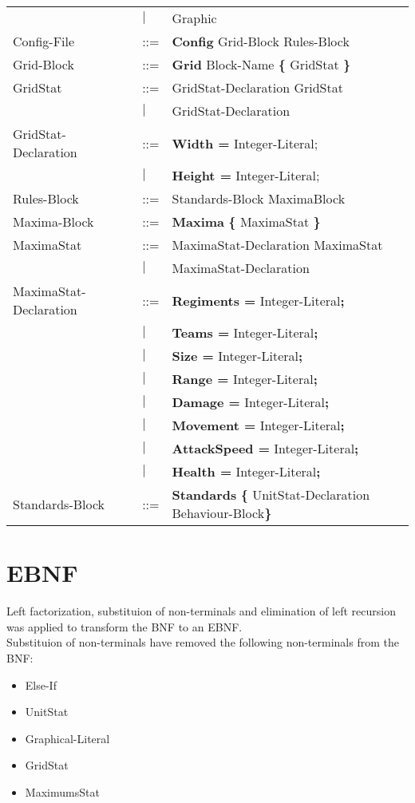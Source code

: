 \begin{center}
\begin{longtable}{l l l}
							&$\mid$	&Graphic\\
Config-File					&	::=	&{\bf Config} Grid-Block Rules-Block\\
Grid-Block					&	::=	&{\bf Grid} Block-Name	 {\bf \{} GridStat \bf{\}}\\
GridStat					&	::=	&GridStat-Declaration GridStat\\
							&$\mid$	&GridStat-Declaration \\
GridStat-Declaration		&	::=	&{\bf Width = } Integer-Literal;\\
							&$\mid$	&{\bf Height = } Integer-Literal;\\
Rules-Block					&	::=	&Standards-Block MaximaBlock\\
Maxima-Block				&	::=	&{\bf Maxima} {\bf \{} MaximaStat {\bf \}} \\
MaximaStat				&	::=		&MaximaStat-Declaration MaximaStat\\
							&$\mid$	&MaximaStat-Declaration\\
MaximaStat-Declaration	&	::=	&{\bf Regiments = } Integer-Literal{\bf ;}\\
							&$\mid$	&{\bf Teams = } Integer-Literal{\bf ;}\\
							&$\mid$	&{\bf Size = } Integer-Literal{\bf ;}\\
							&$\mid$	&{\bf Range = } Integer-Literal{\bf ;}\\
							&$\mid$	&{\bf Damage = } Integer-Literal{\bf ;}\\
							&$\mid$	&{\bf Movement = } Integer-Literal{\bf ;}\\
							&$\mid$	&{\bf AttackSpeed = } Integer-Literal{\bf ;}\\
							&$\mid$	&{\bf Health = } Integer-Literal{\bf ;}\\
Standards-Block				&	::=	&{\bf Standards} {\bf \{ } UnitStat-Declaration Behaviour-Block\bf{\} }\\
\end{longtable}
\end{center}

\chapter{EBNF}
	Left factorization, substituion of non-terminals 
	and elimination of left recursion was applied to transform the BNF to an EBNF. \\

	Substituion of non-terminals have removed the following non-terminals from the BNF: \\
	\begin{itemize}
		\item Else-If
		\item UnitStat
		\item Graphical-Literal
		\item GridStat
		\item MaximumsStat
	\end{itemize}
	

